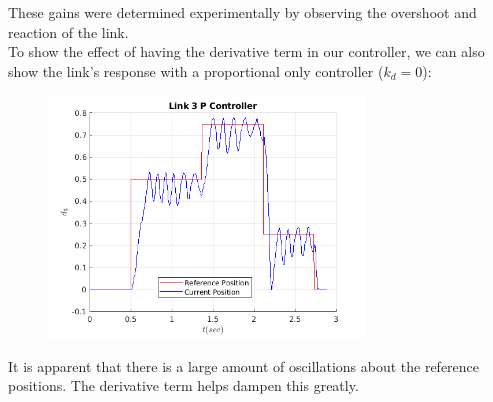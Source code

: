 \documentclass[10pt]{article}
\begin{document}
\begin{enumerate}
	These gains were determined experimentally by observing the overshoot and reaction of the link.
	\\
	
	To show the effect of having the derivative term in our controller, we can also show the link's response with a proportional only controller ($k_d = 0$):
	
	\begin{figure}[H]
		\centering
		\includegraphics[width=0.75\textwidth]{figures/link_3_p_plot1.png}
	\end{figure}

	It is apparent that there is a large amount of oscillations about the reference positions. The derivative term helps dampen this greatly.

\end{enumerate}
\end{document}
